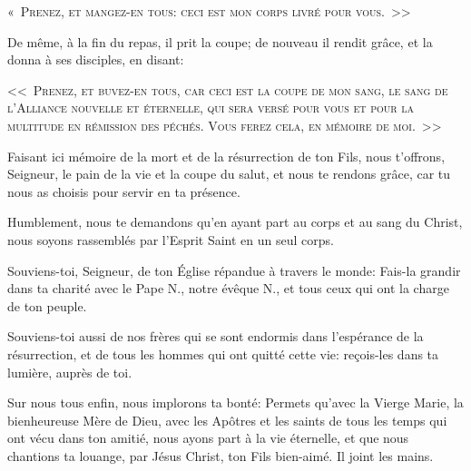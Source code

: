 \textsc{«~Prenez, et mangez-en tous:} 
\textsc{ceci est mon corps livré pour vous.~>>}


De même, à la fin du repas,
il prit la coupe; 
de nouveau il rendit grâce,
et la donna à ses disciples, en disant:

\textsc{<<~Prenez, et buvez-en tous,} 
\textsc{car ceci est la coupe de mon sang,
le sang de l'Alliance nouvelle et éternelle,
qui sera versé
pour vous et pour la multitude
en rémission des péchés.
Vous ferez cela,
en mémoire de moi.~>>}





Faisant ici mémoire
de la mort et de la résurrection de ton Fils,
nous t'offrons, Seigneur,
le pain de la vie et la coupe du salut,
et nous te rendons grâce,
car tu nous as choisis pour servir en ta présence.

Humblement, nous te demandons
qu'en ayant part au corps et au sang du Christ,
nous soyons rassemblés
par l'Esprit Saint
en un seul corps.

Souviens-toi, Seigneur,
de ton Église répandue à travers le monde:
Fais-la grandir dans ta charité
avec le Pape N.,
notre évêque N.,
et tous ceux qui ont la charge de ton peuple.

Souviens-toi aussi de nos frères
qui se sont endormis
dans l'espérance de la résurrection,
et de tous les hommes qui ont quitté cette vie:
reçois-les dans ta lumière, auprès de toi.

Sur nous tous enfin,
nous implorons ta bonté:
Permets qu'avec la Vierge Marie,
la bienheureuse Mère de Dieu,
avec les Apôtres et les saints de tous les temps
qui ont vécu dans ton amitié,
nous ayons part à la vie éternelle,
et que nous chantions ta louange,
par Jésus Christ, ton Fils bien-aimé. Il joint les mains.

